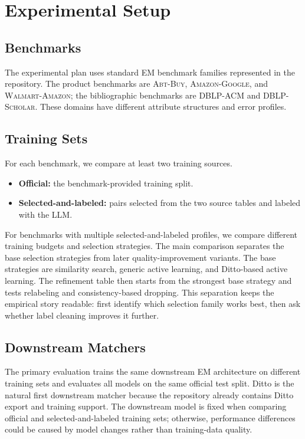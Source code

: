 \section{Experimental Setup}

\subsection{Benchmarks}

The experimental plan uses standard EM benchmark families represented in the repository. The product benchmarks are \textsc{Abt-Buy}, \textsc{Amazon-Google}, and \textsc{Walmart-Amazon}; the bibliographic benchmarks are \textsc{DBLP-ACM} and \textsc{DBLP-Scholar}. These domains have different attribute structures and error profiles.

\subsection{Training Sets}

For each benchmark, we compare at least two training sources.

\begin{itemize}
  \item \textbf{Official:} the benchmark-provided training split.
  \item \textbf{Selected-and-labeled:} pairs selected from the two source tables and labeled with the LLM.
\end{itemize}

For benchmarks with multiple selected-and-labeled profiles, we compare different training budgets and selection strategies. The main comparison separates the base selection strategies from later quality-improvement variants. The base strategies are similarity search, generic active learning, and Ditto-based active learning. The refinement table then starts from the strongest base strategy and tests relabeling and consistency-based dropping. This separation keeps the empirical story readable: first identify which selection family works best, then ask whether label cleaning improves it further.

\subsection{Downstream Matchers}

The primary evaluation trains the same downstream EM architecture on different training sets and evaluates all models on the same official test split. Ditto is the natural first downstream matcher because the repository already contains Ditto export and training support. The downstream model is fixed when comparing official and selected-and-labeled training sets; otherwise, performance differences could be caused by model changes rather than training-data quality.


